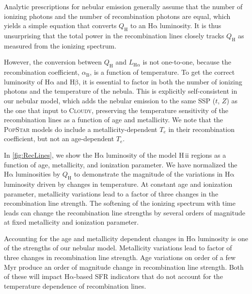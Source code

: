 \documentclass[twocolumn, tighten]{aastex61}
\newcommand{\Fig}[1]{\autoref{fig:#1}}
\newcommand{\Popstar}{\textsc{PopStar}\xspace}
\newcommand{\Cloudy}{\textsc{Cloudy}\xspace}
\newcommand{\Te}{\ensuremath{T_{e}}}
\newcommand{\ha}{\ensuremath{\mathrm{H\alpha}}}
\newcommand{\hb}{\ensuremath{\mathrm{H\beta}}}
\newcommand{\hii}{H\,{\sc ii}\xspace}
\newcommand{\QH}{\ensuremath{Q_{\mathrm{H}}}}
\begin{document}
Analytic prescriptions for nebular emission generally assume that the number of ionizing photons and the number of recombination photons are equal, which yields a simple equation that converts \QH{} to an \ha{} luminosity. It is thus unsurprising that the total power in the recombination lines closely tracks \QH{} as measured from the ionizing spectrum.

However, the conversion between \QH{} and $L_{\mathrm{H}\alpha}$ is not one-to-one, because the recombination coefficient, $\alpha_{\mathrm{B}}$, is a function of temperature. To get the correct luminosity of \ha{} and \hb{}, it is essential to factor in both the number of ionizing photons and the temperature of the nebula. This is explicitly self-consistent in our nebular model, which adds the nebular emission to the same SSP ($t$, $Z$) as the one that input to \Cloudy, preserving the temperature sensitivity of the recombination lines as a function of age and metallicity. We note that the \Popstar models do include a metallicity-dependent \Te{} in their recombination coefficient, but not an age-dependent \Te{}.

In \Fig{RecLines}, we show the \ha{} luminosity of the model \hii regions as a function of age, metallicity, and ionization parameter. We have normalized the \ha{} luminosities by \QH{} to demonstrate the magnitude of the variations in \ha{} luminosity driven by changes in temperature. At constant age and ionization parameter, metallicity variations lead to a factor of three changes in the recombination line strength. The softening of the ionizing spectrum with time leads can change the recombination line strengths by several orders of magnitude at fixed metallicity and ionization parameter. 

Accounting for the age and metallicity dependent changes in \ha{} luminosity is one of the strengths of our nebular model. Metallicity variations lead to factor of three changes in recombination line strength. Age variations on order of a few Myr produce an order of magnitude change in recombination line strength. Both of these will impact \ha-based SFR indicators that do not account for the temperature dependence of recombination lines.
\end{document}
